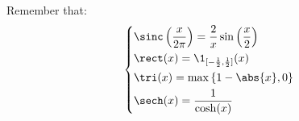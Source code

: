 \documentclass[../mmf.tex]{subfiles}
\begin{document}
\baselineskip
Remember that:
\begin{equation}
	\left\{\begin{aligned}
		&\sinc\left( \frac{x}{2\pi} \right)=\frac{2}{x}\sin\left( \frac{x}{2} \right)\\
		&\rect(x)=\1_{[-\frac{1}{2},\frac{1}{2}]}(x)\\
		&\tri(x)=\max\left\{ 1-\abs{x},0 \right\}\\
		&\sech(x)=\frac{1}{\cosh(x)}
	\end{aligned}\right.
\end{equation}
\end{document}
